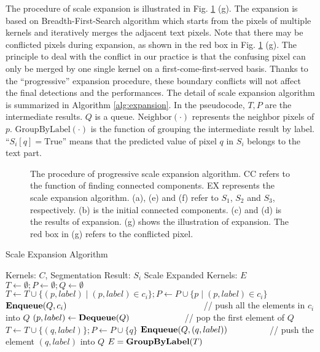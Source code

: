 \documentclass{article}
\begin{document}
The procedure of scale expansion is illustrated in Fig. \ref{fig:pse} (g). The expansion is based on Breadth-First-Search algorithm which starts from the pixels of multiple kernels and iteratively merges the adjacent text pixels. Note that there may be conflicted pixels during expansion, as shown in the red box in Fig. \ref{fig:pse} (g). The principle to deal with the conflict in our practice is that the confusing pixel can only be merged by one single kernel on a first-come-first-served basis. Thanks to the ``progressive'' expansion procedure, these boundary conflicts will not affect the final detections and the performances.
The detail of scale expansion algorithm is summarized in Algorithm \ref{alg:expansion}. In the pseudocode, $T, P$ are the intermediate results. $Q$ is a queue. $\mbox{Neighbor}(\cdot)$ represents the neighbor pixels of $p$. $\mbox{GroupByLabel}(\cdot)$ is the function of grouping the intermediate result by label. ``$S_i[q] = \mbox{True}$'' means that the predicted value of pixel $q$ in $S_i$ belongs to the text part.




\begin{figure}
  \centering
  \setlength{\fboxrule}{0pt}
  \vspace{-14pt}
  \caption{The procedure of progressive scale expansion algorithm. CC refers to the function of finding connected components. EX represents the scale expansion algorithm. (a), (e) and (f) refer to $S_1$, $S_2$ and $S_3$, respectively. (b) is the initial connected components. (c) and (d) is the results of expansion. (g) shows the illustration of expansion. The red box in (g) refers to the conflicted pixel.}
  \label{fig:pse}
    \vspace{-4pt}
\end{figure}

\begin{algorithm}[t]
	\scriptsize
    \caption{Scale Expansion Algorithm}
    \begin{algorithmic}[1]
        \Require Kernels: $C$, Segmentation Result: $S_i$
        \Ensure Scale Expanded Kernels: $E$
            \State $T \gets \emptyset; P \gets \emptyset; Q \gets \emptyset$
           		\State $T \gets T \cup \{(p, label) \mid (p, label) \in c_i\}; P \gets P \cup \{p \mid (p, label) \in c_i\}$
           		\State $\mbox{\bf{Enqueue}}(Q, c_i)$ \ \ \ \ \ \ \ \ \ \ \ \ \ \ \ \ \ \ \ \ \ \ \ \ \ \ \ \ \ \ \ // push all the elements in $c_i$ into $Q$
\EndFor
                \State $(p, label) \gets \mbox{\bf{Dequeue}}(Q)$   \ \ \ \ \ \ \ \ \ \ \ \ // pop the first element of $Q$
                	\State $T \gets T \cup \{(q, label)\}; P \gets P \cup \{q\}$
                	\State $\mbox{\bf{Enqueue}}(Q, (q, label))$ \ \ \ \ \ \ \ \ \ // push the element $(q, label)$ into $Q$
                \EndIf
\EndWhile
            \State $E = \mbox{\bf{GroupByLabel}}(T)$
            \State {}
        \EndFunction
    \end{algorithmic}
    \label{alg:expansion}
\end{algorithm}
\end{document}

